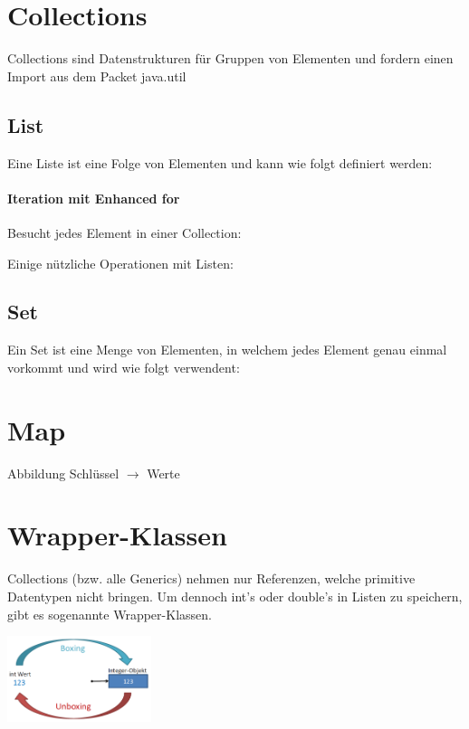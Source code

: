 \section*{Collections}
	Collections sind Datenstrukturen für Gruppen von Elementen und fordern einen Import aus dem Packet java.util
	\subsection*{List}
	\begin{minipage}[t]{11cm}
			Eine Liste ist eine Folge von Elementen und kann wie folgt definiert werden:
			
	\end{minipage}
	\hspace*{0.5cm}
	\begin{minipage}[t]{7.3cm}
		\vspace*{-0.18cm}
		\paragraph*{Iteration mit Enhanced for}
			Besucht jedes Element in einer Collection:
			
	\end{minipage}
	Einige nützliche Operationen mit Listen:
	
	\subsection*{Set}
		Ein Set ist eine Menge von Elementen, in welchem jedes Element genau einmal vorkommt und wird wie folgt verwendent:
		
		
\section*{Map}
		Abbildung Schlüssel $\rightarrow$ Werte
		
		
\section*{Wrapper-Klassen}
	Collections (bzw. alle Generics) nehmen nur Referenzen, welche primitive Datentypen nicht bringen. Um dennoch int's oder double's in Listen zu speichern, gibt es sogenannte Wrapper-Klassen.\\
	\begin{minipage}[t]{10cm}
		
	\end{minipage}
	\hspace*{0.5cm}
	\begin{minipage}[b]{7.3cm}
		\includegraphics[height=2.5cm, align=t]{pics/boxing_unboxing.PNG}
	\end{minipage}